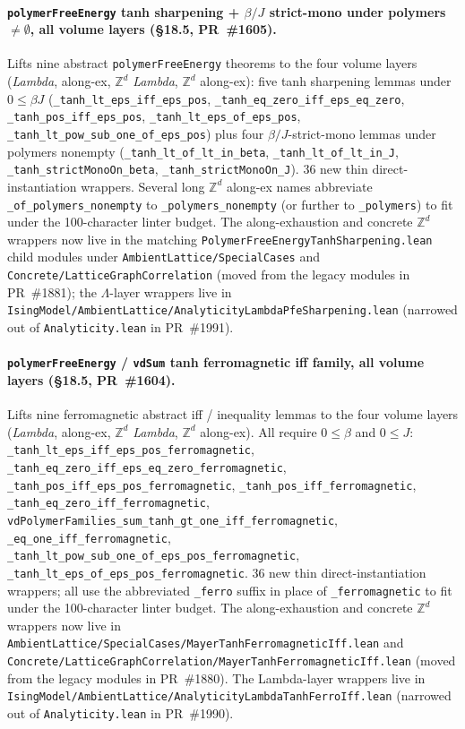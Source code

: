 \documentclass[a4paper,11pt]{article}
\begin{document}
\paragraph{\texttt{polymerFreeEnergy} tanh sharpening + $\beta/J$
strict-mono under polymers $\ne \emptyset$, all volume layers
(\S18.5, PR~\#1605).} Lifts nine abstract \texttt{polymerFreeEnergy}
theorems to the four volume layers (\textit{Lambda}, along-ex,
$\mathbb{Z}^d$ \textit{Lambda}, $\mathbb{Z}^d$ along-ex):
five tanh sharpening lemmas under $0 \le \beta J$
(\texttt{\_tanh\_lt\_eps\_iff\_eps\_pos},
\texttt{\_tanh\_eq\_zero\_iff\_eps\_eq\_zero},
\texttt{\_tanh\_pos\_iff\_eps\_pos},
\texttt{\_tanh\_lt\_eps\_of\_eps\_pos},
\texttt{\_tanh\_lt\_pow\_sub\_one\_of\_eps\_pos}) plus four
$\beta/J$-strict-mono lemmas under polymers nonempty
(\texttt{\_tanh\_lt\_of\_lt\_in\_beta},
\texttt{\_tanh\_lt\_of\_lt\_in\_J},
\texttt{\_tanh\_strictMonoOn\_beta},
\texttt{\_tanh\_strictMonoOn\_J}). 36 new thin
direct-instantiation wrappers. Several long
$\mathbb{Z}^d$ along-ex names abbreviate
\texttt{\_of\_polymers\_nonempty} to \texttt{\_polymers\_nonempty}
(or further to \texttt{\_polymers}) to fit under the
100-character linter budget.
The along-exhaustion and concrete $\mathbb{Z}^d$ wrappers now live in the
matching \texttt{PolymerFreeEnergyTanhSharpening.lean} child modules under
\texttt{AmbientLattice/SpecialCases} and
\texttt{Concrete/LatticeGraphCorrelation} (moved from the legacy modules in
PR~\#1881); the $\Lambda$-layer wrappers live in
\texttt{IsingModel/AmbientLattice/AnalyticityLambdaPfeSharpening.lean}
(narrowed out of \texttt{Analyticity.lean} in PR~\#1991).

\paragraph{\texttt{polymerFreeEnergy} / \texttt{vdSum} tanh
ferromagnetic iff family, all volume layers (\S18.5, PR~\#1604).}
Lifts nine ferromagnetic abstract iff / inequality lemmas to the
four volume layers (\textit{Lambda}, along-ex, $\mathbb{Z}^d$
\textit{Lambda}, $\mathbb{Z}^d$ along-ex). All require
$0 \le \beta$ and $0 \le J$:
\texttt{\_tanh\_lt\_eps\_iff\_eps\_pos\_ferromagnetic},
\texttt{\_tanh\_eq\_zero\_iff\_eps\_eq\_zero\_ferromagnetic},
\texttt{\_tanh\_pos\_iff\_eps\_pos\_ferromagnetic},
\texttt{\_tanh\_pos\_iff\_ferromagnetic},
\texttt{\_tanh\_eq\_zero\_iff\_ferromagnetic},
\texttt{vdPolymerFamilies\_sum\_tanh\_gt\_one\_iff\_ferromagnetic},
\texttt{\_eq\_one\_iff\_ferromagnetic},
\texttt{\_tanh\_lt\_pow\_sub\_one\_of\_eps\_pos\_ferromagnetic},
\texttt{\_tanh\_lt\_eps\_of\_eps\_pos\_ferromagnetic}.
36 new thin direct-instantiation wrappers; all use the
abbreviated \texttt{\_ferro} suffix in place of
\texttt{\_ferromagnetic} to fit under the 100-character linter
budget. The along-exhaustion and concrete $\mathbb{Z}^d$ wrappers
now live in
\texttt{AmbientLattice/SpecialCases/MayerTanhFerromagneticIff.lean}
and
\texttt{Concrete/LatticeGraphCorrelation/MayerTanhFerromagneticIff.lean}
(moved from the legacy modules in PR~\#1880). The Lambda-layer
wrappers live in
\texttt{IsingModel/AmbientLattice/AnalyticityLambdaTanhFerroIff.lean}
(narrowed out of \texttt{Analyticity.lean} in PR~\#1990).
\end{document}
